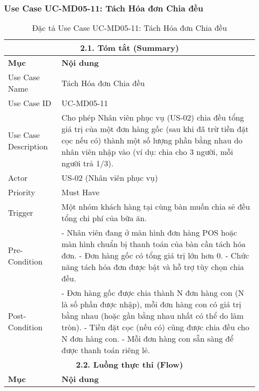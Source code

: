 \subsubsection{Use Case UC-MD05-11: Tách Hóa đơn Chia đều}
\begin{longtable}{|m{4cm}|p{11cm}|}
\caption{Đặc tả Use Case UC-MD05-11: Tách Hóa đơn Chia đều} \label{tab:uc_md05_11_final} \\
\hline
\multicolumn{2}{|c|}{\textbf{2.1. Tóm tắt (Summary)}} \\
\hline
\textbf{Mục} & \textbf{Nội dung} \\
\hline
\endhead %
\hline
\endfoot %
\hline
\endlastfoot %
Use Case Name & Tách Hóa đơn Chia đều \\
\hline
Use Case ID & UC-MD05-11 \\
\hline
Use Case Description & Cho phép Nhân viên phục vụ (US-02) chia đều tổng giá trị của một đơn hàng gốc (sau khi đã trừ tiền đặt cọc nếu có) thành một số lượng phần bằng nhau do nhân viên nhập vào (ví dụ: chia cho 3 người, mỗi người trả 1/3). \\
\hline
Actor & US-02 (Nhân viên phục vụ) \\
\hline
Priority & Must Have \\
\hline
Trigger & Một nhóm khách hàng tại cùng bàn muốn chia sẻ đều tổng chi phí của bữa ăn. \\
\hline
Pre-Condition & - Nhân viên đang ở màn hình đơn hàng POS hoặc màn hình chuẩn bị thanh toán của bàn cần tách hóa đơn. \newline - Đơn hàng gốc có tổng giá trị lớn hơn 0. \newline - Chức năng tách hóa đơn được bật và hỗ trợ tùy chọn chia đều. \\
\hline
Post-Condition & - Đơn hàng gốc được chia thành N đơn hàng con (N là số phần được nhập), mỗi đơn hàng con có giá trị bằng nhau (hoặc gần bằng nhau nhất có thể do làm tròn). \newline - Tiền đặt cọc (nếu có) cũng được chia đều cho N đơn hàng con. \newline - Mỗi đơn hàng con sẵn sàng để được thanh toán riêng lẻ. \\
\hline
\multicolumn{2}{|c|}{\textbf{2.2. Luồng thực thi (Flow)}} \\
\hline
\textbf{Mục} & \textbf{Nội dung} \\
\hline

\end{longtable}
